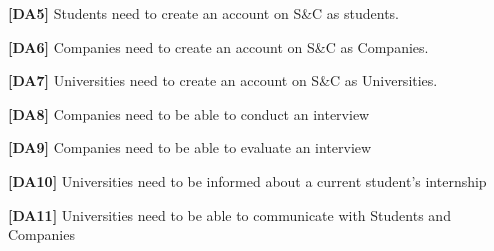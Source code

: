 \textbf{[DA5]} Students need to create an account on S\&C as students.

\textbf{[DA6]} Companies need to create an account on S\&C as Companies.

\textbf{[DA7]} Universities need to create an account on S\&C as Universities.

\textbf{[DA8]} Companies need to be able to conduct an interview

\textbf{[DA9]} Companies need to be able to evaluate an interview

\textbf{[DA10]} Universities need to be informed about a current student's internship

\textbf{[DA11]} Universities need to be able to communicate with Students and Companies
